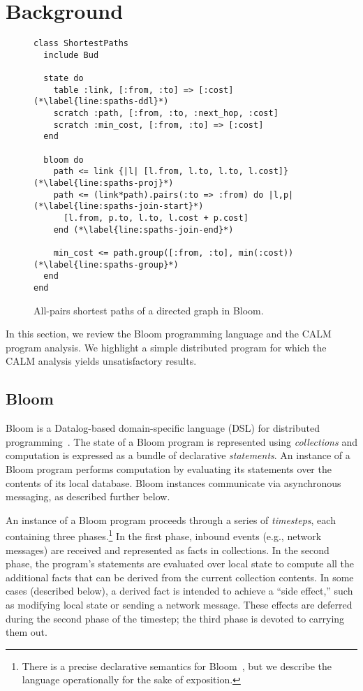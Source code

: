 \section{Background}
\label{sec:background}

\begin{figure}[t]
\begin{scriptsize}
\begin{lstlisting}
class ShortestPaths
  include Bud

  state do
    table :link, [:from, :to] => [:cost] (*\label{line:spaths-ddl}*)
    scratch :path, [:from, :to, :next_hop, :cost]
    scratch :min_cost, [:from, :to] => [:cost]
  end

  bloom do
    path <= link {|l| [l.from, l.to, l.to, l.cost]} (*\label{line:spaths-proj}*)
    path <= (link*path).pairs(:to => :from) do |l,p| (*\label{line:spaths-join-start}*)
      [l.from, p.to, l.to, l.cost + p.cost]
    end (*\label{line:spaths-join-end}*)

    min_cost <= path.group([:from, :to], min(:cost)) (*\label{line:spaths-group}*)
  end
end
\end{lstlisting}
\end{scriptsize}
\caption{All-pairs shortest paths of a directed graph in Bloom.}
\label{fig:bloom-spaths}
\end{figure}

In this section, we review the Bloom programming language and the CALM program
analysis.  We highlight a simple distributed program for which the CALM analysis
yields unsatisfactory results.

\pagebreak
\subsection{Bloom}
\label{sec:bg-bloom}

Bloom is a Datalog-based domain-specific language (DSL) for distributed
programming~\cite{Alvaro2011,bloom}. The state of a Bloom program is represented
using \emph{collections} and computation is expressed as a bundle of declarative
\emph{statements}.  An instance of a Bloom program performs computation by
evaluating its statements over the contents of its local database. Bloom
instances communicate via asynchronous messaging, as described further below.

An instance of a Bloom program proceeds through a series of \emph{timesteps},
each containing three phases.\footnote{There is a precise declarative semantics
  for Bloom~\cite{dedalus}, but we describe the language operationally for the
  sake of exposition.} In the first phase, inbound events (e.g., network
messages) are received and represented as facts in collections. In the second
phase, the program's statements are evaluated over local state to compute all
the additional facts that can be derived from the current collection
contents. In some cases (described below), a derived fact is intended to achieve
a ``side effect,'' such as modifying local state or sending a network message.
These effects are deferred during the second phase of the timestep; the third
phase is devoted to carrying them out.

